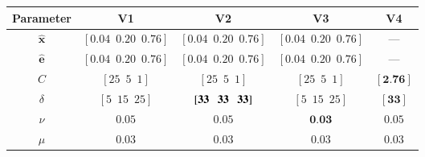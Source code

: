 \begin{tabular}{ccccc}
	\toprule
	  Parameter    &                   V1                   &                    V2                     &                   V3                   &         V4          \\
	\midrule
	$\bm{\hat{x}}$ & $[ 0.04 \enspace 0.20 \enspace 0.76 ]$ &  $[ 0.04 \enspace 0.20 \enspace 0.76 ]$   & $[ 0.04 \enspace 0.20 \enspace 0.76 ]$ &         ---         \\
	$\bm{\hat{e}}$ & $[ 0.04 \enspace 0.20 \enspace 0.76 ]$ &  $[ 0.04 \enspace 0.20 \enspace 0.76 ]$   & $[ 0.04 \enspace 0.20 \enspace 0.76 ]$ &         ---         \\
	     $C$       &     $[ 25 \enspace 5 \enspace 1 ]$     &      $[ 25 \enspace 5 \enspace 1 ]$       &     $[ 25 \enspace 5 \enspace 1 ]$     & $[ \textbf{2.76} ]$ \\
	   $\delta$    &    $[ 5 \enspace 15 \enspace 25 ]$     & $[ \textbf{33 \enspace 33 \enspace 33} ]$ &    $[ 5 \enspace 15 \enspace 25 ]$     & $[ \textbf{33}  ]$  \\
	    $\nu$      &                 $0.05$                 &                  $0.05$                   &            $\textbf{0.03}$             &       $0.05$        \\
	    $\mu$      &                 $0.03$                 &                  $0.03$                   &                 $0.03$                 &       $0.03$        \\
	\bottomrule
\end{tabular}